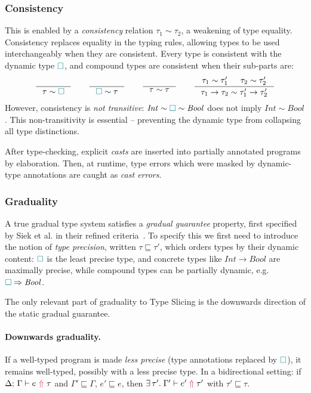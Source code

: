 \subsubsection{Consistency}

This is enabled by a \textit{consistency} relation $\tau_1 \sim \tau_2$, a weakening of type equality. Consistency replaces equality in the typing rules, allowing types to be used interchangeably when they are consistent. Every type is consistent with the dynamic type ${\color{teal}\Box}$, and compound types are consistent when their sub-parts are:
\[\inference{}{\tau \sim \gap} \qquad \inference{}{\gap \sim \tau} \qquad \inference{}{\tau \sim \tau} \qquad \inference{\tau_1 \sim \tau_1' & \tau_2 \sim \tau_2'}{\tau_1 \to \tau_2 \sim \tau_1' \to \tau_2'}\]
However, consistency is \textit{not transitive}: $\mathit{Int} \sim {\color{teal}\Box} \sim \mathit{Bool}$ does not imply $\mathit{Int} \sim \mathit{Bool}$. This non-transitivity is essential -- preventing the dynamic type from collapsing all type distinctions.

After type-checking, explicit \textit{casts} are inserted into partially annotated programs by elaboration. Then, at runtime, type errors which were masked by dynamic-type annotations are caught as \textit{cast errors}.

\subsubsection{Graduality}

A true gradual type system satisfies a \textit{gradual guarantee} property, first specified by Siek et al. in their refined criteria~\cite{GradualRefined}. To specify this we first need to introduce the notion of \textit{type precision}, written $\tau \sqsubseteq \tau'$, which orders types by their dynamic content: ${\color{teal}\Box}$ is the least precise type, and concrete types like $\mathit{Int} \to \mathit{Bool}$ are maximally precise, while compound types can be partially dynamic, e.g. ${\color{teal}\Box} \Rightarrow \mathit{Bool}$.

The only relevant part of graduality to Type Slicing is the downwards direction of the static gradual guarantee. 

\paragraph{Downwards graduality.} If a well-typed program is made \textit{less precise} (type annotations replaced by ${\color{teal}\Box}$), it remains well-typed, possibly with a less precise type. In a bidirectional setting: if $\synthesis{e}{\tau}$ and $\Gamma' \sqsubseteq \Gamma$, $e' \sqsubseteq e$, then $\exists\,\tau'.\; \Gamma' \vdash e'\;{\color{BrickRed}\Uparrow}\;\tau'$ with $\tau' \sqsubseteq \tau$.

